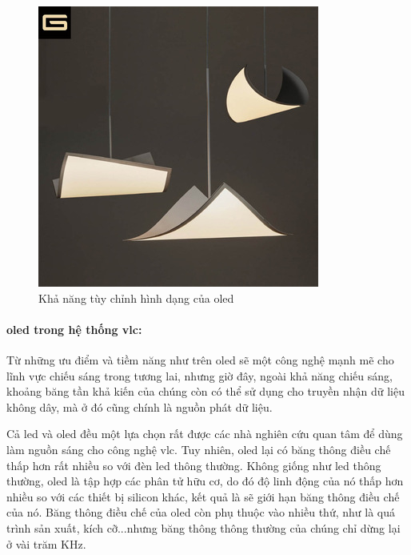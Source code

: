 \begin{figure} [ht]
	\centering
	\captionsetup{justification=centering}
	\includegraphics [scale=0.5] {Image/oled}
	\caption{Khả năng tùy chỉnh hình dạng của \ac{oled}}
\end{figure}

\paragraph{\ac{oled} trong hệ thống \ac{vlc}:}
Từ những ưu điểm và tiềm năng như trên \ac{oled} sẽ một công nghệ mạnh mẽ cho lĩnh vực chiếu sáng trong tương lai, nhưng giờ đây, ngoài khả năng chiếu sáng, khoảng băng tần khả kiến của chúng còn có thể sử dụng cho truyền nhận dữ liệu không dây, mà ở đó cũng chính là nguồn phát dữ liệu. 

Cả \ac{led} và \ac{oled} đều một lựa chọn rất được các nhà nghiên cứu quan tâm để dùng làm nguồn sáng cho công nghệ \ac{vlc}. Tuy nhiên, \ac{oled} lại có băng thông điều chế thấp hơn rất nhiều so với đèn \ac{led} thông thường. Không giống như \ac{led} thông thường, \ac{oled} là tập hợp các phân tử hữu cơ, do đó độ linh động của nó thấp hơn nhiều so với các thiết bị silicon khác, kết quả là sẽ giới hạn băng thông điều chế của nó. Băng thông điều chế của \ac{oled} còn phụ thuộc vào nhiều thứ, như là quá trình sản xuất, kích cỡ...nhưng băng thông thông thường của chúng chỉ dừng lại ở vài trăm KHz.

